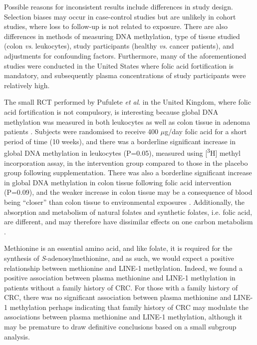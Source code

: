 \noindent Possible reasons for inconsistent results include differences in study design. Selection biases may occur in case-control studies but are unlikely in cohort studies, where loss to follow-up is not related to exposure. There are also differences in methods of measuring DNA methylation, type of tissue studied (colon \emph{vs}. leukocytes), study participants (healthy \emph{vs}. cancer patients), and adjustments for confounding factors. Furthermore, many of the aforementioned studies were conducted in the United States where folic acid fortification is mandatory, and subsequently plasma concentrations of study participants were relatively high.

\noindent The small RCT performed by Pufulete \emph{et al}. in the United Kingdom, where folic acid fortification is not compulsory, is interesting because global DNA methylation was measured in both leukocytes as well as colon tissue in adenoma patients \cite{c552}. Subjects were randomised to receive 400 $\mu$g/day folic acid for a short period of time (10 weeks), and there was a borderline significant increase in global DNA methylation in leukocytes (P=0.05), measured using [\textsuperscript{3}H] methyl incorporation assay, in the intervention group compared to those in the placebo group following supplementation. There was also a borderline significant increase in global DNA methylation in colon tissue following folic acid intervention (P=0.09), and the weaker increase in colon tissue may be a consequence of blood being ``closer'' than colon tissue to environmental exposures \cite{c553}. Additionally, the absorption and metabolism of natural folates and synthetic folates, i.e. folic acid, are different, 
and may therefore have dissimilar effects on one carbon metabolism \cite{c554,c555}.

\noindent Methionine is an essential amino acid, and like folate, it is required for the synthesis of \emph{S}-adenosylmethionine, and as such, we would expect a positive relationship between methionine and LINE-1 methylation. Indeed, we found a positive association between plasma methionine and LINE-1 methylation in patients without a family history of CRC. For those with a family history of CRC, there was no significant association between plasma methionine and LINE-1 methylation perhaps indicating that family history of CRC may modulate the associations between plasma methionine and LINE-1 methylation, although it may be premature to draw definitive conclusions based on a small subgroup analysis.

